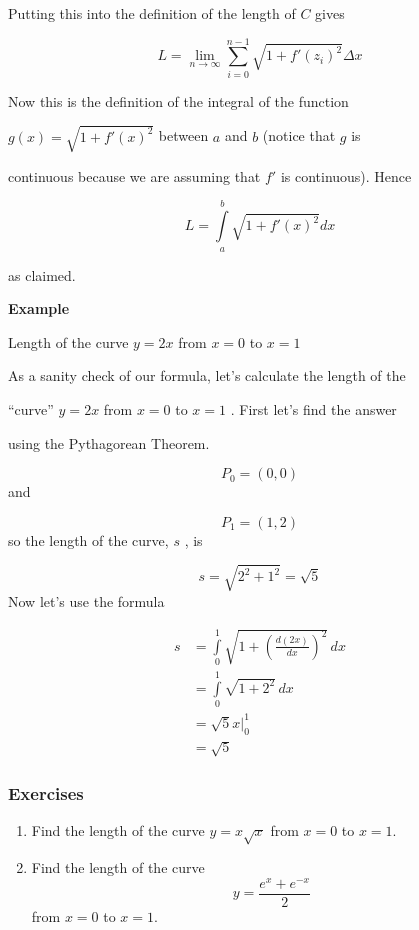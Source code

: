 Putting this into the definition of the length of $C$ gives


\[
L=\lim _{n\to\infty}\sum _{i=0}^{n-1}\sqrt{1+f'(z_i)^2}\Delta x
\]


Now this is the definition of the integral of the function

$g(x)=\sqrt{1+f'(x)^2}$ between $a$ and $b$ (notice that $g$ is

continuous because we are assuming that $f'$ is continuous). Hence


\[
L=\int\limits_a^b \sqrt{1+f'(x)^2}dx
\]


as claimed.


\textbf{Example}


Length of the curve $y=2x$ from $x=0$ to $x=1$


As a sanity check of our formula, let's calculate the length of the

``curve'' $y=2x$ from $x=0$ to $x=1$ . First let's find the answer

using the Pythagorean Theorem.


\[
P_0=(0,0)
\] and


\[
P_1=(1,2)
\] so the length of the curve, $s$ , is


\[
s=\sqrt{2^2+1^2}=\sqrt5
\] Now let's use the formula


\begin{align}
s &= \int\limits_0^1 \sqrt{1+\left(\tfrac{d(2x)}{dx}\right)^2}\,dx \\&= \int\limits_0^1 \sqrt{1+2^2}\,dx \\&= \sqrt{5}x\bigg| _0^1 \\&= \sqrt{5}
\end{align}


\subsubsection{Exercises}
\label{sss:exer-arclength}

\begin{enumerate}
\item Find the length of the curve $y = x\sqrt{x}$ from $x=0$ to $x=1$.

\item Find the length of the curve 
\[
y = \frac{e^x + e^{-x}}{2}
\]
from $x=0$ to $x=1$.
\end{enumerate}

